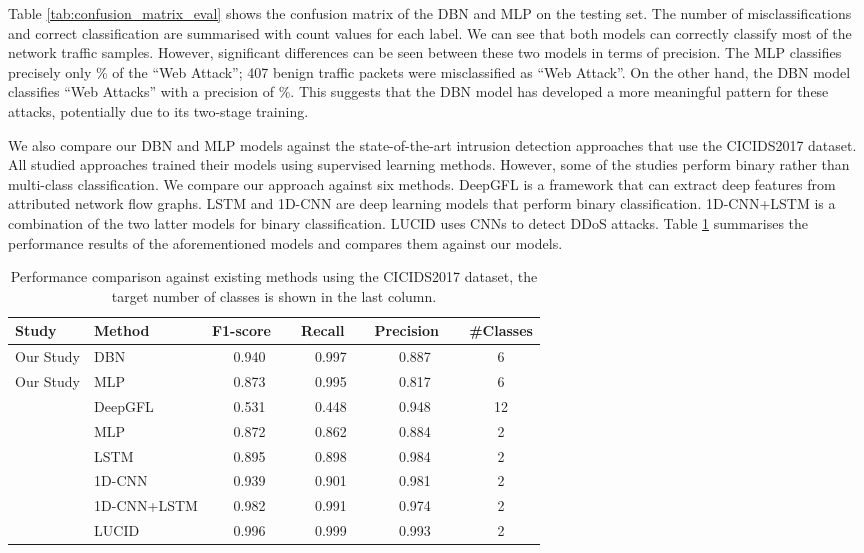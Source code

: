 \documentclass[runningheads]{llncs}
\begin{document}
Table \ref{tab:confusion_matrix_eval} shows the confusion matrix of the \ac{DBN} and \ac{MLP} on the testing set. The number of misclassifications and correct classification are summarised with count values for each label. We can see that both models can correctly classify most of the network traffic samples. However, significant differences can be seen between these two models in terms of precision. The \ac{MLP} classifies precisely only \% of the ``Web Attack''; 407 benign traffic packets were misclassified as ``Web Attack''. On the other hand, the \ac{DBN} model classifies ``Web Attacks'' with a precision of \%. This suggests that the \ac{DBN} model has developed a more meaningful pattern for these attacks, potentially due to its two-stage training.

We also compare our \ac{DBN} and \ac{MLP} models against the state-of-the-art intrusion detection approaches that use the CICIDS2017 dataset. All studied approaches trained their models using supervised learning methods. However, some of the studies perform binary rather than multi-class classification. We compare our approach against six methods. DeepGFL \cite{DeepGFL} is a framework that can extract deep features from attributed network flow graphs. LSTM and 1D-CNN \cite{1D-CNN-LSTM} are deep learning models that perform binary classification. 1D-CNN+LSTM \cite{1D-CNN-LSTM} is a combination of the two latter models for binary classification. LUCID \cite{LUCID} uses \ac{CNN}s to detect \ac{DDoS} attacks. Table \ref{tab:comparison} summarises the performance results of the aforementioned models and compares them against our models.

\begin{table}[t]
\caption{Performance comparison against existing methods using the CICIDS2017 dataset, the target number of classes is shown in the last column.}
\label{tab:comparison}
\centering
\begin{tabular}{p{2cm}p{2.5cm}cccc}
\toprule
\bf Study          & \bf Method   & \bf F1-score\ \    & \bf Recall\ \  & \bf Precision\ \  &  \bf \#Classes\\
\midrule
Our Study          & DBN          & 0.940    & 0.997    & 0.887   & 6 \\
Our Study          & MLP          & 0.873    & 0.995    & 0.817   & 6 \\
\cite{DeepGFL}     & DeepGFL      & 0.531    & 0.448    & 0.948   & 12\\
\cite{1D-CNN-LSTM} & MLP          & 0.872    & 0.862    & 0.884   & 2 \\
\cite{1D-CNN-LSTM} & LSTM         & 0.895    & 0.898    & 0.984   & 2 \\
\cite{1D-CNN-LSTM} & 1D-CNN       & 0.939    & 0.901    & 0.981   & 2 \\
\cite{1D-CNN-LSTM} & 1D-CNN+LSTM  & 0.982    & 0.991    & 0.974   & 2 \\
\cite{LUCID}       & LUCID        & 0.996    & 0.999    & 0.993   & 2 \\
\bottomrule
\end{tabular}
\end{table}
\end{document}

